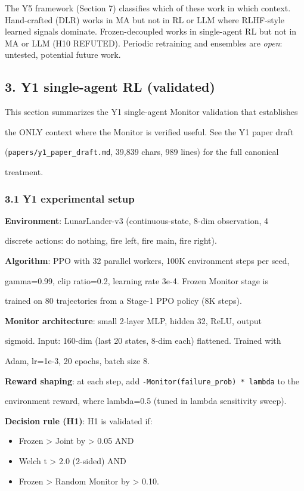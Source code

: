 \documentclass[
]{article}
\begin{document}
The Y5 framework (Section 7) classifies which of these work in which
context. Hand-crafted (DLR) works in MA but not in RL or LLM where
RLHF-style learned signals dominate. Frozen-decoupled works in
single-agent RL but not in MA or LLM (H10 REFUTED). Periodic retraining
and ensembles are \emph{open}: untested, potential future work.

\subsection{3. Y1 single-agent RL
(validated)}\label{y1-single-agent-rl-validated}

This section summarizes the Y1 single-agent Monitor validation that
establishes

the ONLY context where the Monitor is verified useful. See the Y1 paper
draft

(\texttt{papers/y1\_paper\_draft.md}, 39,839 chars, 989 lines) for the
full canonical

treatment.

\subsubsection{3.1 Y1 experimental setup}\label{y1-experimental-setup}

\textbf{Environment}: LunarLander-v3 (continuous-state, 8-dim
observation, 4

discrete actions: do nothing, fire left, fire main, fire right).

\textbf{Algorithm}: PPO with 32 parallel workers, 100K environment steps
per seed,

gamma=0.99, clip ratio=0.2, learning rate 3e-4. Frozen Monitor stage is

trained on 80 trajectories from a Stage-1 PPO policy (8K steps).

\textbf{Monitor architecture}: small 2-layer MLP, hidden 32, ReLU,
output

sigmoid. Input: 160-dim (last 20 states, 8-dim each) flattened. Trained
with

Adam, lr=1e-3, 20 epochs, batch size 8.

\textbf{Reward shaping}: at each step, add
\texttt{-Monitor(failure\_prob)\ *\ lambda} to the

environment reward, where lambda=0.5 (tuned in lambda sensitivity
sweep).

\textbf{Decision rule (H1)}: H1 is validated if:

\begin{itemize}
\item
  Frozen \textgreater{} Joint by \textgreater{} 0.05 AND
\item
  Welch t \textgreater{} 2.0 (2-sided) AND
\item
  Frozen \textgreater{} Random Monitor by \textgreater{} 0.10.
\end{itemize}
\end{document}
